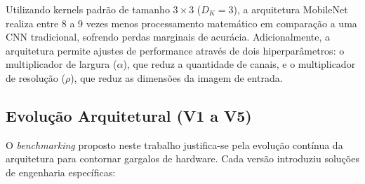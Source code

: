 \documentclass[oneside,english,brazilian]{UNISINOSmonografia}
\begin{document}
Utilizando kernels padrão de tamanho $3 \times 3$ ($D_K = 3$), a arquitetura MobileNet realiza entre 8 a 9 vezes menos processamento matemático em comparação a uma CNN tradicional, sofrendo perdas marginais de acurácia. Adicionalmente, a arquitetura permite ajustes de performance através de dois hiperparâmetros: o multiplicador de largura ($\alpha$), que reduz a quantidade de canais, e o multiplicador de resolução ($\rho$), que reduz as dimensões da imagem de entrada.

\subsection{Evolução Arquitetural (V1 a V5)}

O \textit{benchmarking} proposto neste trabalho justifica-se pela evolução contínua da arquitetura para contornar gargalos de hardware. Cada versão introduziu soluções de engenharia específicas:
\end{document}
